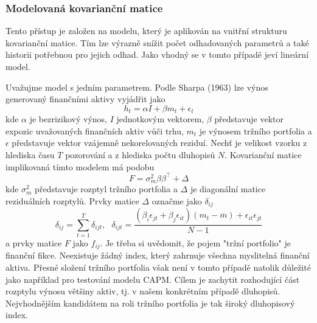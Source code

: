 \documentclass[a4paper]{book}
\begin{document}
\subsubsection{Modelovaná kovarianční matice}

Tento přístup je založen na modelu, který je aplikován na vnitřní strukturu kovarianční matice. Tím lze výrazně snížit počet odhadovaných parametrů a také historii potřebnou pro jejich odhad. Jako vhodný se v tomto případě jeví lineární model.

Uvažujme model s jedním parametrem. Podle Sharpa (1963) lze výnos generovaný finančními aktivy vyjádřit jako
\begin{equation*}
h_t = \alpha I + \beta m_t + \epsilon_t
\end{equation*}
kde $\alpha$ je bezrizikový výnos, $I$ jednotkovým vektorem, $\beta$ představuje vektor expozic uvažovaných finančních aktiv vůči trhu, $m_t$ je výnosem tržního portfolia a $\epsilon$ představuje vektor vzájemně nekorelovaných reziduí. Nechť je velikost vzorku z hlediska času $T$ pozorování a z hlediska počtu dluhopisů $N$. Kovarianční matice implikovaná tímto modelem má podobu
\begin{equation}
F = \sigma_m^2 \beta \beta^{\top} + \Delta
\end{equation}
kde $\sigma_m^2$ představuje rozptyl tržního portfolia a $\Delta$ je diagonální matice reziduálních rozptylů. Prvky matice $\Delta$ označme jako $\delta_{ij}$
\begin{equation*}
\delta_{ij} = \sum_{t=1}^T \delta_{ijt}, ~~~ \delta_{ijt} = \frac{(\beta_i \epsilon_{jt} + \beta_j \epsilon_{it})(m_t - \overline{m}) + \epsilon_{it} \epsilon_{jt}}{N-1}
\end{equation*}
a prvky matice $F$ jako $f_{ij}$. Je třeba si uvědomit, že pojem "tržní portfolio" je finanční fikce. Neexistuje žádný index, který zahrnuje všechna myslitelná finanční aktiva. Přesné složení tržního portfolia však není v tomto případě natolik důležité jako například pro testování modelu CAPM. Cílem je zachytit rozhodující část rozptylu výnosu většiny aktiv, tj. v našem konkrétním případě dluhopisů. Nejvhodnějším kandidátem na roli tržního portfolia je tak široký dluhopisový index.
\end{document}
